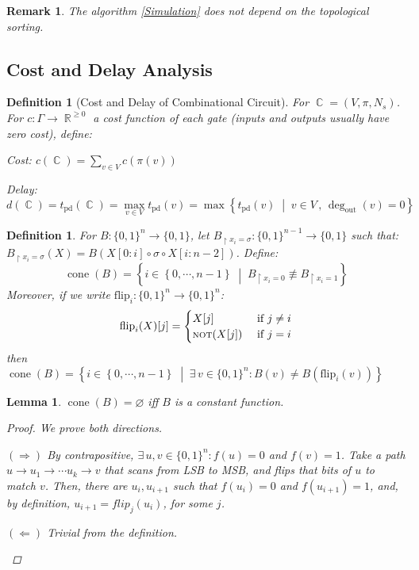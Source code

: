 \documentclass[12pt]{article}
\let\emptyset\varnothing
\let\RA\Rightarrow
\let\LA\Leftarrow
\newcommand{\set}[2]{\left\{{#1}\;\middle|\;{#2}\right\}}
\newcommand{\Exist}[1]{\exists\,{#1}:}
\newcommand{\seq}[2][0]{\left\{{#1},\cdots,{#2}\right\}}
\newcommand{\scr}[1]{{\scriptstyle\textup{#1}}}
\DeclareMathOperator{\R}{\mathbb{R}}
\DeclareMathOperator{\Circ}{\mathbb{C}}
\DeclareMathOperator{\NOT}{\scr{NOT}}
\newcommand*{\B}{\{0,1\}}
\newcommand*{\degout}{\deg_{\text{out}}}
\DeclareMathOperator{\cone}{cone}
\newtheorem{definition}[theorem]{Definition}
\newtheorem{lemma}[theorem]{Lemma}
\newtheorem{remark}[theorem]{Remark}
\begin{document}
\begin{remark}
  The algorithm \ref{Simulation} does not depend on the topological sorting.
\end{remark}

\pagebreak

\subsection{Cost and Delay Analysis}

\begin{definition}[Cost and Delay of Combinational Circuit]
  For $\Circ=(V,\pi,N_s)$. For $c:\Gamma\to\R^{\geq 0}$ a cost function of each gate (inputs and outputs usually have zero cost), define:
  \begin{compactitem}
    \item Cost: $\displaystyle c(\Circ)=\sum_{v\in V}c(\pi(v))$
    \item Delay: $\displaystyle d(\Circ)=t_\text{pd}(\Circ)=\max\limits_{v\in V}t_\text{pd}(v)=\max\set{t_\text{pd}(v)}{v\in V\,,\,\degout(v)=0}$
  \end{compactitem}
\end{definition}

\begin{definition}
  For $B:\B^n\to\B$, let $B_{\upharpoonright x_i=\sigma}:\B^{n-1}\to\B$ such that: $B_{\upharpoonright x_i=\sigma}(X)=B(X[0:i]\circ \sigma\circ X[i:n-2])$. Define: $$\cone(B)=\set{i\in\seq{n-1}}{B_{\upharpoonright x_i=0}\not\equiv B_{\upharpoonright x_i=1}}$$ Moreover, if we write $\text{flip}_i:\B^n\to\B^n$: $$\text{flip}_i(X)[j]=\begin{cases}
    X[j]&\text{ if }j\neq i\\
    \NOT(X[j])&\text{ if }j=i
  \end{cases}$$ then $\cone(B)=\set{i\in\seq{n-1}}{\Exist{v\in\B^n}B(v)\neq B(\text{flip}_i(v))}$
\end{definition}

\begin{lemma}
  $\cone(B)=\emptyset$ iff $B$ is a constant function.
  \begin{proof}
    We prove both directions.
    \begin{compactitem}
      \item[$(\RA)$] By contrapositive, $\Exist{u,v\in\B^n}f(u)=0$ and $f(v)=1$. Take a path $u\to u_1\to\cdots u_k\to v$ that scans from LSB to MSB, and flips that bits of $u$ to match $v$. Then, there are $u_i,u_{i+1}$ such that $f(u_i)=0$ and $f(u_{i+1})=1$, and, by definition, $u_{i+1}=\textit{flip}_j(u_i)$, for some $j$.
      \item[$(\LA)$] Trivial from the definition.
    \end{compactitem}
  \end{proof}
\end{lemma}
\end{document}
